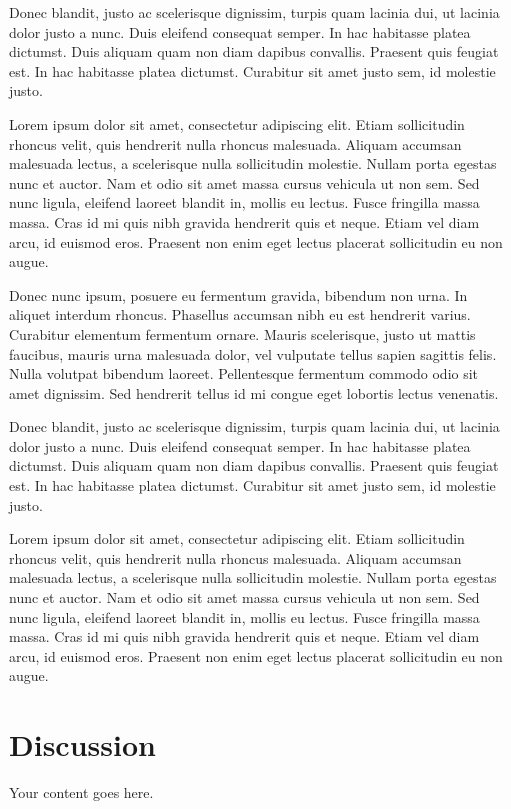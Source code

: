 \documentclass[12pt,lot,lof]{quthesis}
\begin{document}
Donec blandit, justo ac scelerisque dignissim, turpis quam lacinia dui, ut lacinia dolor justo a nunc. Duis eleifend consequat semper. In hac habitasse platea dictumst. Duis aliquam quam non diam dapibus convallis. Praesent quis feugiat est. In hac habitasse platea dictumst. Curabitur sit amet justo sem, id molestie justo.

Lorem ipsum dolor sit amet, consectetur adipiscing elit. Etiam sollicitudin rhoncus velit, quis hendrerit nulla rhoncus malesuada. Aliquam accumsan malesuada lectus, a scelerisque nulla sollicitudin molestie. Nullam porta egestas nunc et auctor. Nam et odio sit amet massa cursus vehicula ut non sem. Sed nunc ligula, eleifend laoreet blandit in, mollis eu lectus. Fusce fringilla massa massa. Cras id mi quis nibh gravida hendrerit quis et neque. Etiam vel diam arcu, id euismod eros. Praesent non enim eget lectus placerat sollicitudin eu non augue.

Donec nunc ipsum, posuere eu fermentum gravida, bibendum non urna. In aliquet interdum rhoncus. Phasellus accumsan nibh eu est hendrerit varius. Curabitur elementum fermentum ornare. Mauris scelerisque, justo ut mattis faucibus, mauris urna malesuada dolor, vel vulputate tellus sapien sagittis felis. Nulla volutpat bibendum laoreet. Pellentesque fermentum commodo odio sit amet dignissim. Sed hendrerit tellus id mi congue eget lobortis lectus venenatis.

Donec blandit, justo ac scelerisque dignissim, turpis quam lacinia dui, ut lacinia dolor justo a nunc. Duis eleifend consequat semper. In hac habitasse platea dictumst. Duis aliquam quam non diam dapibus convallis. Praesent quis feugiat est. In hac habitasse platea dictumst. Curabitur sit amet justo sem, id molestie justo.

Lorem ipsum dolor sit amet, consectetur adipiscing elit. Etiam sollicitudin rhoncus velit, quis hendrerit nulla rhoncus malesuada. Aliquam accumsan malesuada lectus, a scelerisque nulla sollicitudin molestie. Nullam porta egestas nunc et auctor. Nam et odio sit amet massa cursus vehicula ut non sem. Sed nunc ligula, eleifend laoreet blandit in, mollis eu lectus. Fusce fringilla massa massa. Cras id mi quis nibh gravida hendrerit quis et neque. Etiam vel diam arcu, id euismod eros. Praesent non enim eget lectus placerat sollicitudin eu non augue.

\chapter{Discussion}
Your content goes here.
\end{document}

